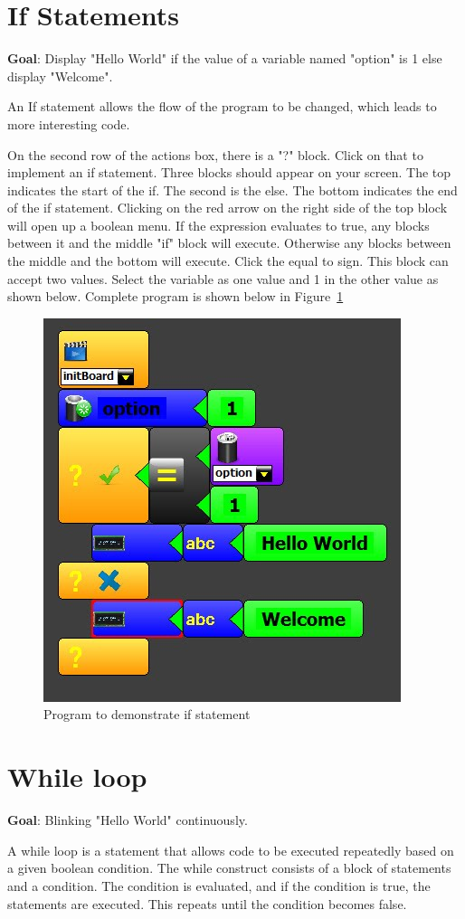 \section{If Statements}

\textbf{Goal}: Display "Hello World" if the value of a variable named "option" is 1 else display "Welcome".

An If statement allows the flow of the program to be changed, which leads to more interesting code. 

On the second row of the actions box, there is a "?" block. Click on that to implement an if statement. Three blocks should appear on your screen. The top indicates the start of the if. The second is the else. The bottom indicates the end of the if statement. Clicking on the red arrow on the right side of the top block will open up a boolean menu. If the expression evaluates to true, any blocks between it and the middle "if" block will execute. Otherwise any blocks between the middle and the bottom will execute. Click the equal to sign. This block can accept two values. Select the variable as one value and 1 in the other value as shown below. Complete program is shown below in Figure~\ref{fig:lesson_4}

\begin{figure}[h]
\centering
\includegraphics[width=0.4\columnwidth]{Images/Manual/lesson_4}
\caption{Program to demonstrate if statement}
\label{fig:lesson_4}
\end{figure}

\section{While loop}

\textbf{Goal}: Blinking "Hello World" continuously.

A while loop is a statement that allows code to be executed repeatedly based on a given boolean condition. The while construct consists of a block of statements and a condition. The condition is evaluated, and if the condition is true, the statements are executed. This repeats until the condition becomes false. 

